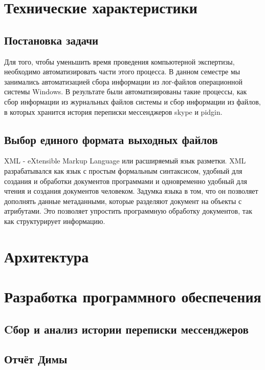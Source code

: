 \documentclass[russian,utf8,14pt,simple]{eskdtext}
\begin{document}
\section{Технические характеристики}
\subsection{Постановка задачи}
Для того, чтобы уменьшить время проведения компьютерной экспертизы, необходимо автоматизировать части этого процесса. В данном семестре мы занимались автоматизацией сбора информации из лог-файлов операционной системы Windows. В результате были автоматизированы такие процессы, как сбор информации из журнальных файлов системы и сбор информации из файлов, в которых хранится история переписки мессенджеров skype и pidgin.

\subsection{Выбор единого формата выходных файлов}
XML - eXtensible Markup Language или расширяемый язык разметки. XML разрабатывался как язык с простым формальным синтаксисом, удобный для создания и обработки документов программами и одновременно удобный для чтения и создания документов человеком. Задумка языка в том, что он позволяет дополнять данные метаданными, которые разделяют документ на объекты с атрибутами. Это позволяет упростить программную обработку документов, так как структурирует информацию.

\section{Архитектура}


\newpage
\section{Разработка программного обеспечения}

\subsection{Cбор и анализ истории переписки мессенджеров} %



\newpage
\subsection{Отчёт Димы}
\end{document}
